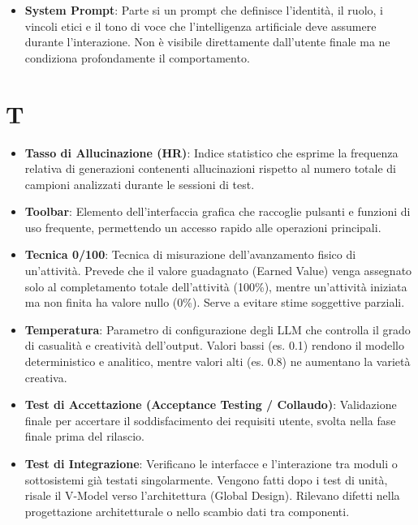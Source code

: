 \documentclass[11pt,a4paper]{article}
\begin{document}
\begin{itemize}
\item \textbf{System Prompt}: Parte si un prompt che definisce l'identità, il ruolo, i vincoli etici e il tono di voce che l'intelligenza artificiale deve assumere durante l'interazione. Non è visibile direttamente dall'utente finale ma ne condiziona profondamente il comportamento.
\end{itemize}

\newpage

\section*{T}
\begin{itemize}
\item \textbf{Tasso di Allucinazione (HR)}: Indice statistico che esprime la frequenza relativa di generazioni contenenti allucinazioni rispetto al numero totale di campioni analizzati durante le sessioni di test.

\item \textbf{Toolbar}: Elemento dell’interfaccia grafica che raccoglie pulsanti e funzioni di uso frequente, permettendo un accesso rapido alle operazioni principali.

\item \textbf{Tecnica 0/100}: Tecnica di misurazione dell'avanzamento fisico di un'attività. Prevede che il valore guadagnato (Earned Value) venga assegnato solo al completamento totale dell'attività (100\%), mentre un'attività iniziata ma non finita ha valore nullo (0\%). Serve a evitare stime soggettive parziali.

\item \textbf{Temperatura}: Parametro di configurazione degli LLM che controlla il grado di casualità e creatività dell'output. Valori bassi (es. 0.1) rendono il modello deterministico e analitico, mentre valori alti (es. 0.8) ne aumentano la varietà creativa.

\item \textbf{Test di Accettazione (Acceptance Testing / Collaudo)}: Validazione finale per accertare il soddisfacimento dei requisiti utente, svolta nella fase finale prima del rilascio.

\item \textbf{Test di Integrazione}: Verificano le interfacce e l'interazione tra moduli o sottosistemi già testati singolarmente. Vengono fatti dopo i test di unità, risale il V-Model verso l'architettura (Global Design). Rilevano difetti nella progettazione architetturale o nello scambio dati tra componenti.


\end{itemize}
\end{document}
